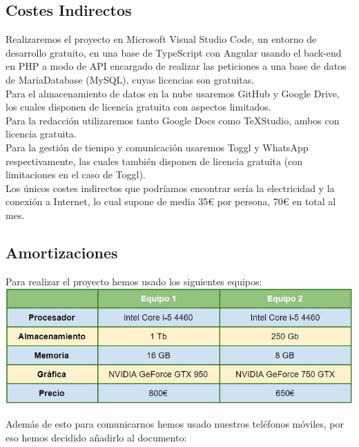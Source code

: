 \subsection{Costes Indirectos}

Realizaremos el proyecto en Microsoft Visual Studio Code, un entorno de desarrollo gratuito, en una base de TypeScript con Angular usando el back-end en PHP a modo de API encargado de realizar las peticiones a una base de datos de MariaDatabase (MySQL), cuyas licencias son gratuitas.\\

Para el almacenamiento de datos en la nube usaremos GitHub y Google Drive, los cuales disponen de licencia gratuita con aspectos limitados.\\

Para la redacción utilizaremos tanto Google Docs como TeXStudio, ambos con licencia gratuita.\\

Para la gestión de tiempo y comunicación usaremos Toggl y WhatsApp respectivamente, las cuales también disponen de licencia gratuita (con limitaciones en el caso de Toggl).\\

Los únicos costes indirectos que podríamos encontrar sería la electricidad y la conexión a Internet, lo cual supone de media 35€ por persona, 70€ en total al mes.\\

\subsection{Amortizaciones}

Para realizar el proyecto hemos usado los siguientes equipos:\\

\includegraphics[width=\textwidth]{img/cap4/equipos.jpg}

\bigskip

Además de esto para comunicarnos hemos usado nuestros teléfonos móviles, por eso hemos decidido añadirlo al documento:\\


